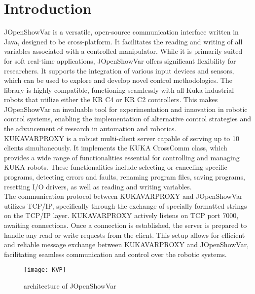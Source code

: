 \section{Introduction}

JOpenShowVar is a versatile, open-source communication 
interface written in Java, designed to be cross-platform. 
It facilitates the reading and writing of all variables 
associated with a controlled manipulator. 
While it is primarily suited for soft real-time applications, 
JOpenShowVar offers significant flexibility for researchers. 
It supports the integration of various input devices and sensors, 
which can be used to explore and develop novel control 
methodologies. The library is highly compatible, 
functioning seamlessly with all Kuka industrial robots that 
utilize either the KR C4 or KR C2 controllers. 
This makes JOpenShowVar an invaluable tool for experimentation 
and innovation in robotic control systems, enabling the 
implementation of alternative control strategies and the 
advancement of research in automation and robotics.\cite{sanfilippo2015controlling}
\\ KUKAVARPROXY is a robust multi-client server capable of 
serving up to 10 clients simultaneously. 
It implements the KUKA CrossComm class, 
which provides a wide range of functionalities essential for 
controlling and managing KUKA robots. 
These functionalities include selecting or canceling 
specific programs, detecting errors and faults, 
renaming program files, saving programs, resetting I/O drivers, 
as well as reading and writing variables.\cite{sanfilippo2015controlling}
\\ The communication protocol between KUKAVARPROXY and 
JOpenShowVar utilizes TCP/IP, specifically through the 
exchange of specially formatted strings on the TCP/IP layer. 
KUKAVARPROXY actively listens on TCP port 7000, awaiting 
connections. Once a connection is established, the server is 
prepared to handle any read or write requests from the client. 
This setup allows for efficient and reliable message exchange 
between KUKAVARPROXY and JOpenShowVar, facilitating seamless 
communication and control over the robotic systems.\cite{sanfilippo2015controlling}

\begin{figure}[h]
    \centering
    \texttt{[image: KVP]}
    \caption{architecture of JOpenShowVar}
    \label{fig:mesh1}
\end{figure}